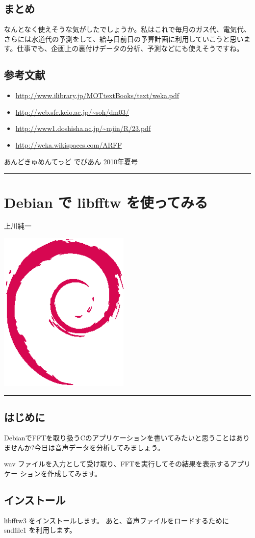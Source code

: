 \documentclass[mingoth,a4paper]{jsarticle}
\renewcommand{\dancersection}[2]{%
\newpage
あんどきゅめんてっど でびあん 2010年夏号
%
\vspace{0.1mm}\\
{\color{dancerlightblue}\rule{\hsize}{2mm}}

%
%
\begin{minipage}[t]{0.6\hsize}
\color{dancerdarkblue}
\vspace{1cm}
\section{#1}
\hfill{}#2\\
\end{minipage}
\begin{minipage}[t]{0.4\hsize}
\vspace{-2cm}
\hfill{}\includegraphics[height=8cm]{image200502/openlogo-nd.eps}\\
\vspace{-5cm}
\end{minipage}
%
%
{\color{dancerdarkblue}\rule{0.74\hsize}{2mm}}
%
\vspace{2cm}
}
\begin{document}
\subsection{まとめ}

なんとなく使えそうな気がしたでしょうか。私はこれで毎月のガス代、電気代、
さらには水道代の予測をして、給与日前日の予算計画に利用していこうと思いま
す。仕事でも、企画上の裏付けデータの分析、予測などにも使えそうですね。

\subsection{参考文献}
\begin{itemize}
 \item \url{http://www.ilibrary.jp/MOTtextBooks/text/weka.pdf}
 \item \url{http://web.sfc.keio.ac.jp/~soh/dm03/}
 \item \url{http://www1.doshisha.ac.jp/~mjin/R/23.pdf}
 \item \url{http://weka.wikispaces.com/ARFF}
\end{itemize}

\dancersection{Debian で libfftw を使ってみる}{上川純一}

\subsection{はじめに}

DebianでFFTを取り扱うCのアプリケーションを書いてみたいと思うことはあり
ませんか?今日は音声データを分析してみましょう。

wav ファイルを入力として受け取り、FFTを実行してその結果を表示するアプリケー
ションを作成してみます。

\subsection{インストール}

libfftw3 をインストールします。
あと、音声ファイルをロードするために sndfile1 を利用します。

\end{document}
